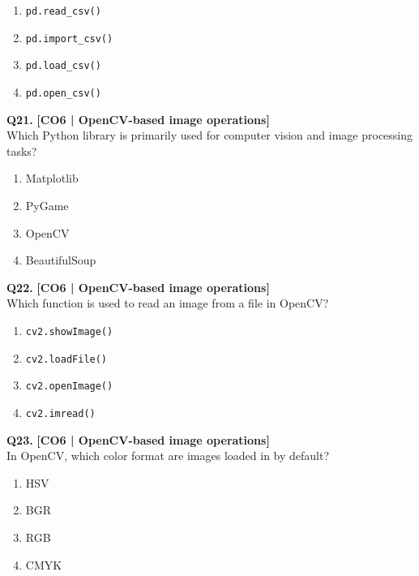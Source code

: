 \begin{enumerate}[label=(\alph*),topsep=2pt,itemsep=1pt,partopsep=0pt,parsep=0pt]
    \item \relax \texttt{pd.read\_csv()}
    \item \relax \texttt{pd.import\_csv()}
    \item \relax \texttt{pd.load\_csv()}
    \item \relax \texttt{pd.open\_csv()}
\end{enumerate}
\vspace{{2mm}}

\noindent\textbf{Q21.} \hfill {\small\color{LPUOrange}\textbf{[CO6 | OpenCV-based image operations]}}\\[2pt]
Which Python library is primarily used for computer vision and image processing tasks?

\begin{enumerate}[label=(\alph*),topsep=2pt,itemsep=1pt,partopsep=0pt,parsep=0pt]
    \item \relax Matplotlib
    \item \relax PyGame
    \item \relax OpenCV
    \item \relax BeautifulSoup
\end{enumerate}
\vspace{{2mm}}

\noindent\textbf{Q22.} \hfill {\small\color{LPUOrange}\textbf{[CO6 | OpenCV-based image operations]}}\\[2pt]
Which function is used to read an image from a file in OpenCV?

\begin{enumerate}[label=(\alph*),topsep=2pt,itemsep=1pt,partopsep=0pt,parsep=0pt]
    \item \relax \texttt{cv2.showImage()}
    \item \relax \texttt{cv2.loadFile()}
    \item \relax \texttt{cv2.openImage()}
    \item \relax \texttt{cv2.imread()}
\end{enumerate}
\vspace{{2mm}}

\noindent\textbf{Q23.} \hfill {\small\color{LPUOrange}\textbf{[CO6 | OpenCV-based image operations]}}\\[2pt]
In OpenCV, which color format are images loaded in by default?

\begin{enumerate}[label=(\alph*),topsep=2pt,itemsep=1pt,partopsep=0pt,parsep=0pt]
    \item \relax HSV
    \item \relax BGR
    \item \relax RGB
    \item \relax CMYK
\end{enumerate}
\vspace{{2mm}}

